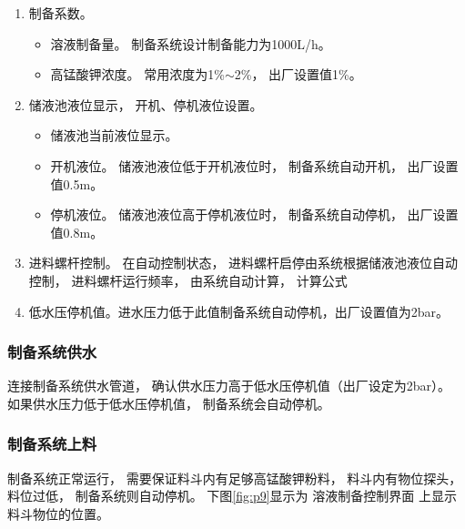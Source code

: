 \documentclass[UTF8,a4paper,12pt,titlepage]{ctexart}
\begin{document}
\begin{enumerate}
\begin{itemize}
                \item 料斗物位过低时，
                    “过低”红灯亮。
                    在自动控制状态，
                    料斗物位过低时，
                    溶液制备过程会自动停止，
                    电动进水阀会自动关闭，
                    螺旋进料器会自动停机。
            \end{itemize}
         \item 制备系数。
            \begin{itemize}
               \item 溶液制备量。
               制备系统设计制备能力为1000L/h。
               \item 高锰酸钾浓度。
               常用浓度为1\%$\sim$2\%，
               出厂设置值1\%。
            \end{itemize}
         \item 储液池液位显示，
            开机、停机液位设置。
            \begin{itemize}
               \item 储液池当前液位显示。
               \item 开机液位。
                  储液池液位低于开机液位时，
                  制备系统自动开机，
                  出厂设置值0.5m。
               \item 停机液位。
                  储液池液位高于停机液位时，
                  制备系统自动停机，
                  出厂设置值0.8m。
            \end{itemize}
         \item 进料螺杆控制。
            在自动控制状态，
            进料螺杆启停由系统根据储液池液位自动控制，
            进料螺杆运行频率，
            由系统自动计算，
            计算公式
         \item 低水压停机值。进水压力低于此值制备系统自动停机，出厂设置值为2bar。
      \end{enumerate}

      \subsubsection{制备系统供水}\label{sec:sg4}
         连接制备系统供水管道，
         确认供水压力高于低水压停机值（出厂设定为2bar）。
         如果供水压力低于低水压停机值，
         制备系统会自动停机。

      \subsubsection{制备系统上料}
         制备系统正常运行，
         需要保证料斗内有足够高锰酸钾粉料，
         料斗内有物位探头，
         料位过低，
         制备系统则自动停机。
         下图\ref{fig:p9}显示为
         溶液制备控制界面
         上显示料斗物位的位置。
\end{document}
